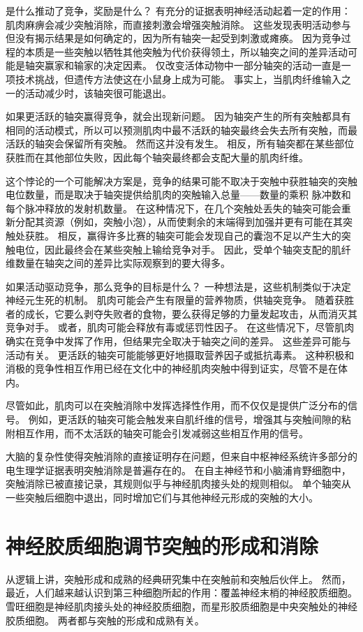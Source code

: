 是什么推动了竞争，奖励是什么？ 有充分的证据表明神经活动起着一定的作用：肌肉麻痹会减少突触消除，而直接刺激会增强突触消除。 这些发现表明活动参与但没有揭示结果是如何确定的，因为所有轴突一起受到刺激或瘫痪。 因为竞争过程的本质是一些突触以牺牲其他突触为代价获得领土，所以轴突之间的差异活动可能是轴突赢家和输家的决定因素。 仅改变活体动物中一部分轴突的活动一直是一项技术挑战，但遗传方法使这在小鼠身上成为可能。 事实上，当肌肉纤维输入之一的活动减少时，该轴突很可能退出。

如果更活跃的轴突赢得竞争，就会出现新问题。 因为轴突产生的所有突触都具有相同的活动模式，所以可以预测肌肉中最不活跃的轴突最终会失去所有突触，而最活跃的轴突会保留所有突触。 然而这并没有发生。 相反，所有轴突都在某些部位获胜而在其他部位失败，因此每个轴突最终都会支配大量的肌肉纤维。

这个悖论的一个可能解决方案是，竞争的结果可能不取决于突触中获胜轴突的突触电位数量，而是取决于轴突提供给肌肉的突触输入总量——数量的乘积 脉冲数和每个脉冲释放的发射机数量。 在这种情况下，在几个突触处丢失的轴突可能会重新分配其资源（例如，突触小泡），从而使剩余的末端得到加强并更有可能在其突触处获胜。 相反，赢得许多比赛的轴突可能会发现自己的囊泡不足以产生大的突触电位，因此最终会在某些突触上输给竞争对手。 因此，受单个轴突支配的肌纤维数量在轴突之间的差异比实际观察到的要大得多。

如果活动驱动竞争，那么竞争的目标是什么？ 一种想法是，这些机制类似于决定神经元生死的机制。 肌肉可能会产生有限量的营养物质，供轴突竞争。 随着获胜者的成长，它要么剥夺失败者的食物，要么获得足够的力量发起攻击，从而消灭其竞争对手。 或者，肌肉可能会释放有毒或惩罚性因子。 在这些情况下，尽管肌肉确实在竞争中发挥了作用，但结果完全取决于轴突之间的差异。 这些差异可能与活动有关。 更活跃的轴突可能能够更好地摄取营养因子或抵抗毒素。 这种积极和消极的竞争性相互作用已经在文化中的神经肌肉突触中得到证实，尽管不是在体内。

尽管如此，肌肉可以在突触消除中发挥选择性作用，而不仅仅是提供广泛分布的信号。 例如，更活跃的轴突可能会触发来自肌纤维的信号，增强其与突触间隙的粘附相互作用，而不太活跃的轴突可能会引发减弱这些相互作用的信号。

大脑的复杂性使得突触消除的直接证明存在问题，但来自中枢神经系统许多部分的电生理学证据表明突触消除是普遍存在的。 在自主神经节和小脑浦肯野细胞中，突触消除已被直接记录，其规则似乎与神经肌肉接头处的规则相似。 单个轴突从一些突触后细胞中退出，同时增加它们与其他神经元形成的突触的大小。

\section{神经胶质细胞调节突触的形成和消除}
从逻辑上讲，突触形成和成熟的经典研究集中在突触前和突触后伙伴上。 然而，最近，人们越来越认识到第三种细胞所起的作用：覆盖神经末梢的神经胶质细胞。 雪旺细胞是神经肌肉接头处的神经胶质细胞，而星形胶质细胞是中央突触处的神经胶质细胞。 两者都与突触的形成和成熟有关。

